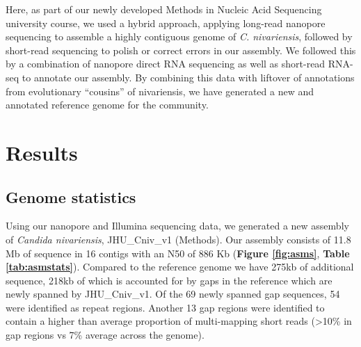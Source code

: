 Here, as part of our newly developed Methods in Nucleic Acid Sequencing university course, we used a hybrid approach, applying long-read nanopore sequencing to assemble a highly contiguous genome of \textit{C. nivariensis}, followed by short-read sequencing to polish or correct errors in our assembly. We followed this by a combination of nanopore direct RNA sequencing as well as short-read RNA-seq to annotate our assembly. By combining this data with liftover of annotations from evolutionary “cousins” of nivariensis, we have generated a new and annotated reference genome for the community.


\section{Results}
\label{sec:results}

\subsection{Genome statistics}
\label{sec:genstat}


Using our nanopore and Illumina sequencing data, we generated a new assembly of \textit{Candida nivariensis}, JHU\_Cniv\_v1 (Methods).  Our assembly consists of 11.8 Mb of sequence in 16 contigs with an N50 of 886 Kb ({\bf Figure \ref{fig:asms}}, {\bf Table \ref{tab:asmstats}}). Compared to the reference genome we have 275kb of additional sequence, 218kb of which is accounted for by gaps in the reference which are newly spanned by JHU\_Cniv\_v1. Of the 69 newly spanned gap sequences, 54 were identified as repeat regions. Another 13 gap regions were identified to contain a higher than average proportion of multi-mapping short reads (>10\% in gap regions vs 7\% average across the genome).



